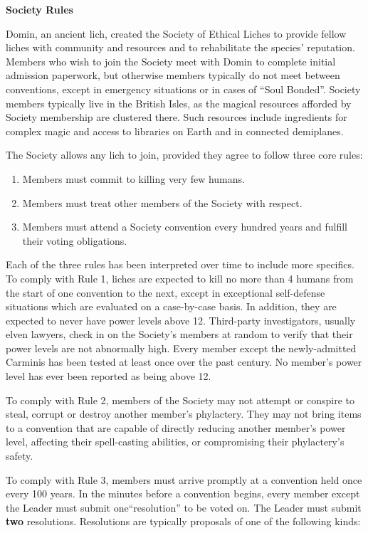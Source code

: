 \documentclass[blue]{Sel}
\begin{document}
\name{\bSociety{}}
\textbf{Society Rules}

Domin, an ancient lich, created the Society of Ethical Liches to provide fellow liches with community and resources and to rehabilitate the species' reputation. Members who wish to join the Society meet with Domin to complete initial admission paperwork, but otherwise members typically do not meet between conventions, except in emergency situations or in cases of ``Soul Bonded''. Society members typically live in the British Isles, as the magical resources afforded by Society membership are clustered there. Such resources include ingredients for complex magic and access to libraries on Earth and in connected demiplanes.

The Society allows any lich to join, provided they agree to follow three core rules:

\begin{enumerate}
\item Members must commit to killing very few humans.
\item Members must treat other members of the Society with respect.
\item Members must attend a Society convention every hundred years and fulfill their voting obligations.
\end{enumerate}

Each of the three rules has been interpreted over time to include more specifics. To comply with Rule 1, liches are expected to kill no more than 4 humans from the start of one convention to the next, except in exceptional self-defense situations which are evaluated on a case-by-case basis. In addition, they are expected to never have power levels above 12. Third-party investigators, usually elven lawyers, check in on the Society's members at random to verify that their power levels are not abnormally high. Every member except the newly-admitted Carminis has been tested at least once over the past century. No member's power level has ever been reported as being above 12.

To comply with Rule 2, members of the Society may not attempt or conspire to steal, corrupt or destroy another member's phylactery. They may not bring items to a convention that are capable of directly reducing another member's power level, affecting their spell-casting abilities, or compromising their phylactery's safety.

To comply with Rule 3, members must arrive promptly at a convention held once every 100 years. In the minutes before a convention begins, every member except the Leader must submit one``resolution'' to be voted on. The Leader must submit {\bf two} resolutions. Resolutions are typically proposals of one of the following kinds:
\end{document}
